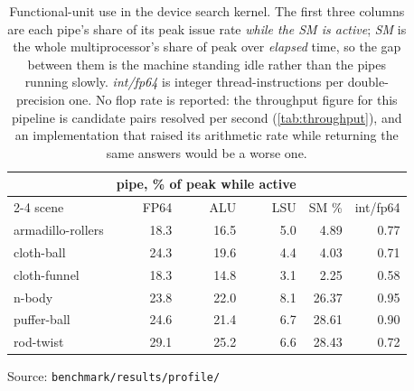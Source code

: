 \begin{table}[!tb]
  \centering
  \caption{Functional-unit use in the device search kernel. The first three
    columns are each pipe's share of its peak issue rate \emph{while the SM is
    active}; \emph{SM} is the whole multiprocessor's share of peak over
    \emph{elapsed} time, so the gap between them is the machine standing idle
    rather than the pipes running slowly. \emph{int/fp64} is integer
    thread-instructions per double-precision one. No flop rate is reported: the
    throughput figure for this pipeline is candidate pairs resolved per second
    (\cref{tab:throughput}), and an implementation that raised its arithmetic
    rate while returning the same answers would be a worse one.}
  \label{tab:pipes}
  \begin{tabular}{lrrrrr}
    \toprule
    & \multicolumn{3}{c}{pipe, \% of peak while active}
      & \multicolumn{2}{c}{} \\
    \cmidrule(lr){2-4}
    scene & FP64 & ALU & LSU & SM \% & int/fp64 \\
    \midrule
    armadillo-rollers & 18.3 & 16.5 & 5.0 & 4.89 & 0.77 \\
    cloth-ball & 24.3 & 19.6 & 4.4 & 4.03 & 0.71 \\
    cloth-funnel & 18.3 & 14.8 & 3.1 & 2.25 & 0.58 \\
    n-body & 23.8 & 22.0 & 8.1 & 26.37 & 0.95 \\
    puffer-ball & 24.6 & 21.4 & 6.7 & 28.61 & 0.90 \\
    rod-twist & 29.1 & 25.2 & 6.6 & 28.43 & 0.72 \\
    \bottomrule
  \end{tabular}
  \par\smallskip\footnotesize Source: \texttt{benchmark/results/profile/}
\end{table}
